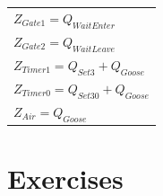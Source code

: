 \begin{tabular}{l}

$Z_{Gate1}	= Q_{WaitEnter}$  \\
$Z_{Gate2}	= Q_{WaitLeave}$ \\
$Z_{Timer1}	= Q_{Set3} + Q_{Goose}$ \\
$Z_{Timer0}	= Q_{Set30} + Q_{Goose}$ \\
$Z_{Air}	= Q_{Goose}$ \\
\end{tabular}

\section{Exercises}

